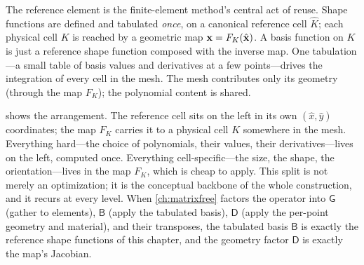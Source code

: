 \begin{keyidea}
The reference element is the finite-element method's central act of reuse. Shape
functions are defined and tabulated \emph{once}, on a canonical reference cell
$\hat K$; each physical cell $K$ is reached by a geometric map $\mathbf{x} = F_K(\hat{\mathbf{x}})$.
A basis function on $K$ is just a reference shape function composed with the inverse
map. One tabulation---a small table of basis values and derivatives at a few
points---drives the integration of every cell in the mesh. The mesh contributes only
its geometry (through the map $F_K$); the polynomial content is shared.
\end{keyidea}

 shows the arrangement. The reference cell sits on the left in its
own $(\hat x,\hat y)$ coordinates; the map $F_K$ carries it to a physical cell $K$
somewhere in the mesh. Everything hard---the choice of polynomials, their values,
their derivatives---lives on the left, computed once. Everything cell-specific---the
size, the shape, the orientation---lives in the map $F_K$, which is cheap to apply.
This split is not merely an optimization; it is the conceptual backbone of the whole
construction, and it recurs at every level. When \cref{ch:matrixfree} factors the
operator into $\mathsf{G}$ (gather to elements), $\mathsf{B}$ (apply the tabulated
basis), $\mathsf{D}$ (apply the per-point geometry and material), and their
transposes, the tabulated basis $\mathsf{B}$ is exactly the reference shape
functions of this chapter, and the geometry factor $\mathsf{D}$ is exactly the map's
Jacobian.

